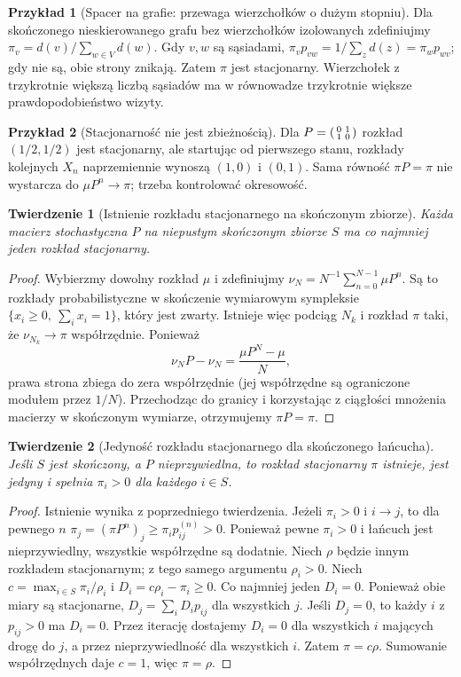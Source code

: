 \documentclass[11pt,a4paper,oneside]{report}
\numberwithin{equation}{chapter}
\theoremstyle{plain}
\newtheorem{twierdzenie}{Twierdzenie}[chapter]
\theoremstyle{definition}
\newtheorem{przyklad}{Przykład}[chapter]
\theoremstyle{remark}
\begin{document}
\begin{przyklad}[Spacer na grafie: przewaga wierzchołków o dużym stopniu]
Dla skończonego nieskierowanego grafu bez
wierzchołków izolowanych zdefiniujmy
$\pi_v=d(v)/\sum_{w\in V}d(w)$.
Gdy $v,w$ są sąsiadami,
$\pi_vp_{vw}=1/\sum_zd(z)=\pi_wp_{wv}$;
gdy nie są, obie strony znikają. Zatem $\pi$
jest stacjonarny. Wierzchołek z trzykrotnie
większą liczbą sąsiadów ma w równowadze
trzykrotnie większe prawdopodobieństwo wizyty.
\end{przyklad}

\begin{przyklad}[Stacjonarność nie jest zbieżnością]
Dla $P=\begin{psmallmatrix}0&1\\1&0\end{psmallmatrix}$
rozkład $(1/2,1/2)$ jest stacjonarny, ale startując
od pierwszego stanu, rozkłady kolejnych $X_n$
naprzemiennie wynoszą $(1,0)$ i $(0,1)$.
Sama równość $\pi P=\pi$ nie wystarcza do
$\mu P^n\to\pi$; trzeba kontrolować okresowość.
\end{przyklad}

\begin{twierdzenie}[Istnienie rozkładu stacjonarnego na skończonym zbiorze]
Każda macierz stochastyczna $P$ na niepustym
skończonym zbiorze $S$ ma co najmniej jeden
rozkład stacjonarny.
\end{twierdzenie}
\begin{proof}
Wybierzmy dowolny rozkład $\mu$ i zdefiniujmy
$\nu_N=N^{-1}\sum_{n=0}^{N-1}\mu P^n$.
Są to rozkłady probabilistyczne w skończenie
wymiarowym sympleksie
$\{x_i\geq0,\ \sum_i x_i=1\}$, który jest zwarty.
Istnieje więc podciąg $N_k$ i rozkład $\pi$ taki,
że $\nu_{N_k}\to\pi$ współrzędnie. Ponieważ
\[
\nu_NP-\nu_N=\frac{\mu P^N-\mu}{N},
\]
prawa strona zbiega do zera współrzędnie
(jej współrzędne są ograniczone modułem przez $1/N$).
Przechodząc do granicy i korzystając z ciągłości
mnożenia macierzy w skończonym wymiarze,
otrzymujemy $\pi P=\pi$.
\end{proof}

\begin{twierdzenie}[Jedyność rozkładu stacjonarnego dla skończonego łańcucha]
Jeśli $S$ jest skończony, a $P$ nieprzywiedlna,
to rozkład stacjonarny $\pi$ istnieje, jest jedyny
i spełnia $\pi_i>0$ dla każdego $i\in S$.
\end{twierdzenie}
\begin{proof}
Istnienie wynika z poprzedniego twierdzenia.
Jeżeli $\pi_i>0$ i $i\to j$, to dla pewnego $n$
$\pi_j=(\pi P^n)_j\geq\pi_i p_{ij}^{(n)}>0$.
Ponieważ pewne $\pi_i>0$ i łańcuch jest
nieprzywiedlny, wszystkie współrzędne są dodatnie.
Niech $\rho$ będzie innym rozkładem stacjonarnym;
z tego samego argumentu $\rho_i>0$.
Niech $c=\max_{i\in S}\pi_i/\rho_i$ i
$D_i=c\rho_i-\pi_i\geq0$. Co najmniej jeden $D_i=0$.
Ponieważ obie miary są stacjonarne,
$D_j=\sum_iD_i p_{ij}$ dla wszystkich $j$.
Jeśli $D_j=0$, to każdy $i$ z $p_{ij}>0$ ma $D_i=0$.
Przez iterację dostajemy $D_i=0$ dla wszystkich $i$
mających drogę do $j$, a przez nieprzywiedlność
dla wszystkich $i$. Zatem $\pi=c\rho$.
Sumowanie współrzędnych daje $c=1$, więc
$\pi=\rho$.
\end{proof}
\end{document}
